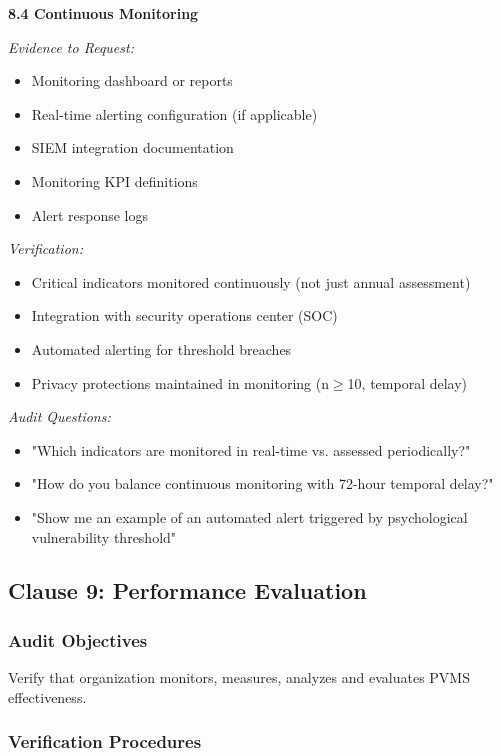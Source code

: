 \documentclass[11pt,a4paper]{article}
\begin{document}
\textbf{8.4 Continuous Monitoring}

\textit{Evidence to Request:}
\begin{itemize}
\item Monitoring dashboard or reports
\item Real-time alerting configuration (if applicable)
\item SIEM integration documentation
\item Monitoring KPI definitions
\item Alert response logs
\end{itemize}

\textit{Verification:}
\begin{itemize}
\item Critical indicators monitored continuously (not just annual assessment)
\item Integration with security operations center (SOC)
\item Automated alerting for threshold breaches
\item Privacy protections maintained in monitoring (n$\geq$10, temporal delay)
\end{itemize}

\textit{Audit Questions:}
\begin{itemize}
\item "Which indicators are monitored in real-time vs. assessed periodically?"
\item "How do you balance continuous monitoring with 72-hour temporal delay?"
\item "Show me an example of an automated alert triggered by psychological vulnerability threshold"
\end{itemize}

\subsection{Clause 9: Performance Evaluation}

\subsubsection{Audit Objectives}

Verify that organization monitors, measures, analyzes and evaluates PVMS effectiveness.

\subsubsection{Verification Procedures}
\end{document}
